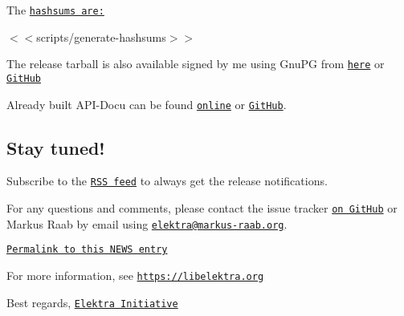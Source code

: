 The \href{https://github.com/ElektraInitiative/ftp/blob/master/releases/elektra-0.8.23.tar.gz.hashsum?raw=true}{\tt hashsums are\+:}

$<$$<${\ttfamily scripts/generate-\/hashsums}$>$$>$

The release tarball is also available signed by me using Gnu\+PG from \href{https://www.libelektra.org/ftp/elektra/releases/elektra-0.8.23.tar.gz.gpg}{\tt here} or \href{https://github.com/ElektraInitiative/ftp/blob/master/releases//elektra-0.8.23.tar.gz.gpg?raw=true}{\tt Git\+Hub}

Already built A\+P\+I-\/\+Docu can be found \href{https://doc.libelektra.org/api/0.8.23/html/}{\tt online} or \href{https://github.com/ElektraInitiative/doc/tree/master/api/0.8.23}{\tt Git\+Hub}.

\subsection*{Stay tuned!}

Subscribe to the \href{https://www.libelektra.org/news/feed.rss}{\tt R\+SS feed} to always get the release notifications.

For any questions and comments, please contact the issue tracker \href{http://issues.libelektra.org}{\tt on Git\+Hub} or Markus Raab by email using \href{mailto:elektra@markus-raab.org}{\tt elektra@markus-\/raab.\+org}.

\href{https://www.libelektra.org/news/0.8.23-release}{\tt Permalink to this N\+E\+WS entry}

For more information, see \href{https://libelektra.org}{\tt https\+://libelektra.\+org}

Best regards, \href{https://www.libelektra.org/developers/authors}{\tt Elektra Initiative} 